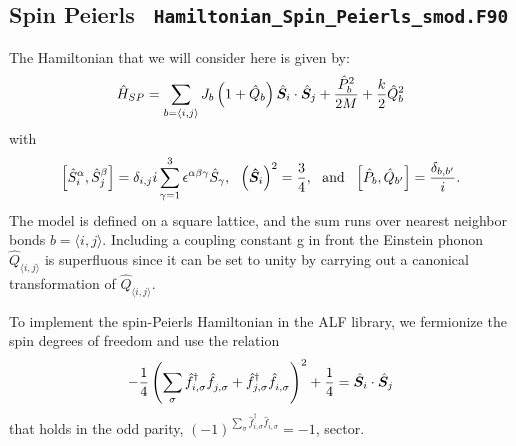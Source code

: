 

\subsection{Spin  Peierls   \texttt{ Hamiltonian\_Spin\_Peierls\_smod.F90 }} \label{Spin_Peierls.Sec}

The  Hamiltonian  that  we  will  consider here  is  given  by: 
\begin{equation}
\label{eqn:Ham_SP}
	\hat{H}_{SP}  =       \sum_{b=\langle  i, j \rangle }  J_b    \left( 1 + \hat{Q}_{b} \right)   \hat{\boldsymbol{S}}_i \cdot \hat{\boldsymbol{S}}_j    +  
	   \frac{\hat{P}_{b} ^2 }{2M}   +    \frac{k}{2} \hat{Q}_{b} ^2 
\end{equation}
with 
\begin{equation}
    \left[   \hat{S}^{\alpha}_i , \hat{S}^{\beta}_j \right]   =    \delta_{i,j}  i  \sum_{\gamma=1}^{3} \epsilon^{\alpha  \beta \gamma}  \hat{S}_{\gamma},  \, \, \, \,  
     \left(   \boldsymbol{\hat{S}}_i  \right)^2  = \frac{3}{4}, \, \, \, \,  \text{and} \,  \, \, \,  \left[ \hat{P}_b,  \hat{Q}_{b'}  \right]   =   \frac{ \delta_{b,b'} } {i}.      
\end{equation}
The model  is  defined  on a  square lattice,  and    the  sum  runs  over  nearest  neighbor  bonds $b = \langle  i, j \rangle $.    Including  a   coupling  constant  g  in  front   the  Einstein phonon   $ \hat{Q}_{\langle  i, j \rangle} $  is  superfluous  since it can   be  set  to  unity  by  carrying out  a  
canonical  transformation of   $ \hat{Q}_{\langle  i, j \rangle} $.     

To implement  the  spin-Peierls  Hamiltonian  in the ALF  library,  we   fermionize the  spin  degrees  of   freedom  and  use  the  relation 
\begin{equation}
      -\frac{1}{4} \left( \sum_{\sigma}   \hat{f}^{\dagger}_{i,\sigma}  \hat{f}^{\phantom\dagger}_{j,\sigma}    + \hat{f}^{\dagger}_{j,\sigma}  \hat{f}^{\phantom\dagger}_{i,\sigma}   \right)^2  +  \frac{1}{4}     =   \hat{\ve{S}}_i \cdot \hat{\ve{S}}_j   
\end{equation}
that   holds  in the odd parity,  $ (-1)^{ \sum_{\sigma} \hat{f}^{\dagger}_{i,\sigma}  \hat{f}^{\phantom\dagger}_{i,\sigma} }  = -1 $,  sector.  

